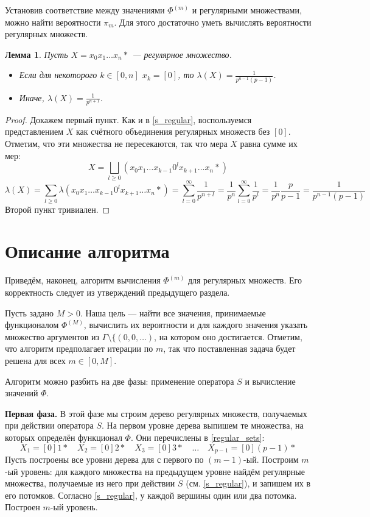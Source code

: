 \documentclass[14pt, a4paper, russian]{report}
\newtheorem{lemma}{\indent Лемма}
\begin{document}
Установив соответствие между значениями $\Phi^{(m)}$ и регулярными множествами, можно найти вероятности $\pi_m$. Для этого достаточно уметь вычислять вероятности регулярных множеств.
\begin{lemma}\label{regular_proba}
Пусть $X=x_0 x_1 \ldots x_n*$ --- регулярное множество.
\begin{itemize}
\item Если для некоторого $k \in [0, n]$ $x_k = [0]$, то $\lambda(X)=\frac{1}{p^{n-1}(p-1)}$.
\item Иначе, $\lambda(X)=\frac{1}{p^{n+1}}$.
\end{itemize}
\end{lemma}
\begin{proof}
Докажем первый пункт. Как и в \cref{s_regular}, воспользуемся представлением $X$ как счётного объединения регулярных множеств без $[0]$. Отметим, что эти множества не пересекаются, так что мера $X$ равна сумме их мер: 
$$ X = \bigsqcup \limits_{l \ge 0} (x_0 x_1 \ldots x_{k-1} 0^l x_{k+1} \ldots x_n *) $$
$$ \lambda(X) = \sum\limits_{l \ge 0}\lambda(x_0 x_1 \ldots x_{k-1} 0^l x_{k+1} \ldots x_n *) = 
\sum\limits_{l = 0}^{\infty} \frac{1}{p^{n+l}} = \frac{1}{p^{n}}\sum\limits_{l = 0}^{\infty} \frac{1}{p^l}  = \frac{1}{p^{n}}\frac{p}{p-1} = \frac{1}{p^{n-1}(p-1)}$$
Второй пункт тривиален.
\end{proof}
\section{Описание алгоритма}
Приведём, наконец, алгоритм вычисления $\Phi^{(m)}$ для регулярных множеств. Его корректность следует из утверждений предыдущего раздела. 

Пусть задано $M > 0$. Наша цель --- найти все значения, принимаемые функционалом $\Phi^{(M)}$, вычислить их вероятности и для каждого значения указать множество аргументов из $\Gamma\setminus \{(0,0,\ldots)$, на котором оно достигается. Отметим, что алгоритм предполагает итерации по $m$, так что поставленная задача будет решена для всех $m \in [0, M]$.

Алгоритм можно разбить на две фазы: применение оператора $S$ и вычисление значений $\Phi$.


\textbf{Первая фаза. }В этой фазе мы строим дерево регулярных множеств, получаемых при действии оператора $S$. На первом уровне дерева выпишем те множества, на которых определён функционал $\Phi$. Они перечислены в \cref{regular_sets}:
$$ X_1=[0]1* \quad X_2=[0]2* \quad X_3=[0]3* \quad \ldots \quad X_{p-1}=[0](p-1)*$$
Пусть построены все уровни дерева для с первого по $(m-1)$-ый. Построим $m$-ый уровень: для каждого множества на предыдущем уровне найдём регулярные множества, получаемые из него при действии $S$ (см. \cref{s_regular}), и запишем их в его потомков. Согласно \cref{s_regular}, у каждой вершины один или два потомка. Построен $m$-ый уровень.
\end{document}
